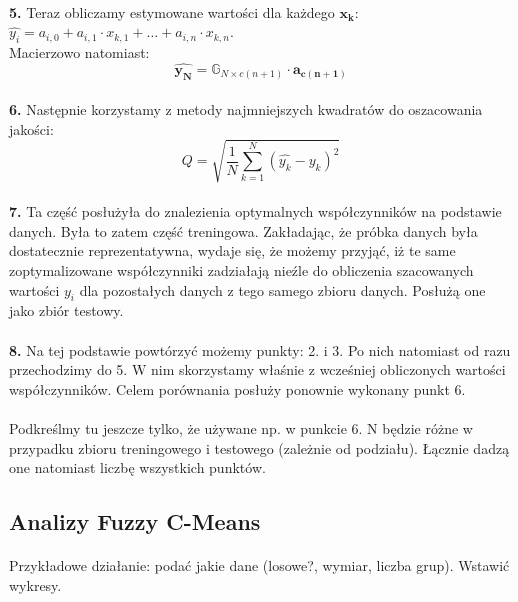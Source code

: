 \documentclass[10pt,a4paper]{article}
\begin{document}
\paragraph{}
\textbf{5.} Teraz obliczamy estymowane wartości dla każdego $\bm{x_k}$:\\
$\hat{y_i} = a_{i,0} + a_{i, 1} \cdot x_{k, 1} + \ldots + a_{i, n} \cdot x_{k, n}$.\\
Macierzowo natomiast:
\[ \bm{\hat{y_N}} = \mathbb{G}_{N \times c(n + 1)} \cdot \bm{a_{c(n + 1)}} \] 

\paragraph{}
\textbf{6.} Następnie korzystamy z metody najmniejszych kwadratów do oszacowania jakości:
\[ Q = \sqrt{\frac{1}{N} \sum_{k = 1}^{N} (\hat{y_k} - y_k)^2} \]

\paragraph{}
\textbf{7.} Ta część posłużyła do znalezienia optymalnych współczynników na podstawie danych. Była to zatem część treningowa. Zakładając, że próbka danych była dostatecznie reprezentatywna, wydaje się, że możemy przyjąć, iż te same zoptymalizowane współczynniki zadziałają nieźle do obliczenia szacowanych wartości $y_i$ dla pozostałych danych z tego samego zbioru danych. Posłużą one jako zbiór testowy.

\paragraph{}
\textbf{8.} Na tej podstawie powtórzyć możemy punkty: 2. i 3. Po nich natomiast od razu przechodzimy do 5. W nim skorzystamy właśnie z wcześniej obliczonych wartości współczynników. Celem porównania posłuży ponownie wykonany punkt 6. 

\paragraph{}
Podkreślmy tu jeszcze tylko, że używane np. w punkcie 6. N będzie różne w przypadku zbioru treningowego i testowego (zależnie od podziału). Łącznie dadzą one natomiast liczbę wszystkich punktów.

\subsection{Analizy Fuzzy C-Means}
\paragraph{}
Przykładowe działanie: podać jakie dane (losowe?, wymiar, liczba grup). Wstawić wykresy.
\end{document}
